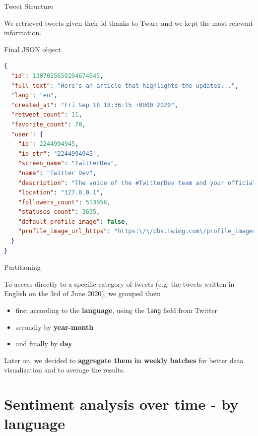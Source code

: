 \documentclass[8pt]{beamer}  %
\begin{document}
\begin{frame}[fragile]{Tweet Structure}

	We retrieved tweets given their id thanks to Twarc and we kept the most relevant information.
	
	\begin{block}{Final JSON object}
    		\begin{lstlisting}[language=json]
{
  "id": 1307025659294674945,
  "full_text": "Here's an article that highlights the updates...",
  "lang": "en",
  "created_at": "Fri Sep 18 18:36:15 +0000 2020",
  "retweet_count": 11,
  "favorite_count": 70,
  "user": {
    "id": 2244994945,
    "id_str": "2244994945",
    "screen_name": "TwitterDev",
    "name": "Twitter Dev",
    "description": "The voice of the #TwitterDev team and your official...",
    "location": "127.0.0.1",
    "followers_count": 513958,
    "statuses_count": 3635,
    "default_profile_image": false,
    "profile_image_url_https": "https:\/\/pbs.twimg.com\/profile_images\/1283786620521652229\/lEODkLTh_normal.jpg"
  }
}
        \end{lstlisting}
	\end{block}
	
\end{frame}

\begin{frame}{Partitioning}

	To access directly to a specific category of tweets (e.g. the tweets written in English on the 3rd of June 2020), we grouped them 
	
	\begin{itemize}
	    \item first according to the \textbf{language}, using the \texttt{lang} field from Twitter
	    \item secondly by \textbf{year-month}
	    \item and finally by \textbf{day}
	\end{itemize}
	
    Later on, we decided to \textbf{aggregate them in weekly batches} for better data visualization and to average the results.

\end{frame}

\section{Sentiment analysis over time - by language}
\end{document}
